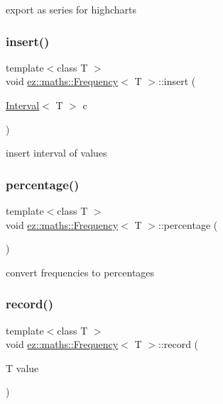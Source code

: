 export as series for highcharts \mbox{\label{classez_1_1maths_1_1Frequency_a93882872b801cb8f47e61f32b24a051a}} 
\subsubsection{\texorpdfstring{insert()}{insert()}}
{\footnotesize\ttfamily template$<$class T $>$ \\
void \hyperlink{classez_1_1maths_1_1Frequency}{ez\+::maths\+::\+Frequency}$<$ T $>$\+::insert (\begin{DoxyParamCaption}\item[{\hyperlink{classez_1_1maths_1_1Interval}{Interval}$<$ T $>$}]{c }\end{DoxyParamCaption})\hspace{0.3cm}{\ttfamily [inline]}}

insert interval of values \mbox{\label{classez_1_1maths_1_1Frequency_a4b1bc9f927a526e0ca1bbc59f1a14ca6}} 
\subsubsection{\texorpdfstring{percentage()}{percentage()}}
{\footnotesize\ttfamily template$<$class T $>$ \\
void \hyperlink{classez_1_1maths_1_1Frequency}{ez\+::maths\+::\+Frequency}$<$ T $>$\+::percentage (\begin{DoxyParamCaption}{ }\end{DoxyParamCaption})\hspace{0.3cm}{\ttfamily [inline]}}

convert frequencies to percentages \mbox{\label{classez_1_1maths_1_1Frequency_acd474d72e33becac99dc5dff9bcdb3e8}} 
\subsubsection{\texorpdfstring{record()}{record()}}
{\footnotesize\ttfamily template$<$class T $>$ \\
void \hyperlink{classez_1_1maths_1_1Frequency}{ez\+::maths\+::\+Frequency}$<$ T $>$\+::record (\begin{DoxyParamCaption}\item[{T}]{value }\end{DoxyParamCaption})\hspace{0.3cm}{\ttfamily [inline]}}

